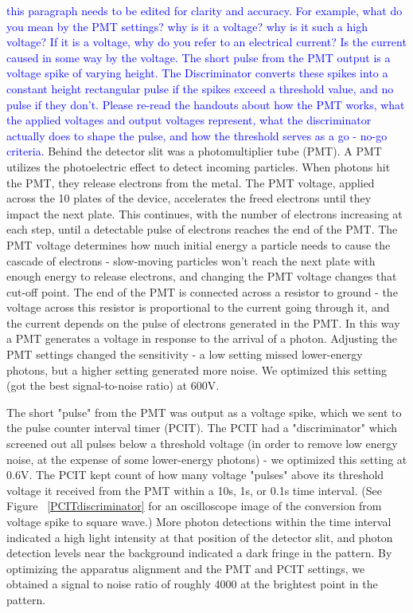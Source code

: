 \documentclass[prb,preprint]{revtex4-1}
\begin{document}
\textcolor{blue}{this paragraph needs to be edited for clarity and accuracy. For example, what do you mean by the PMT settings? why is it a voltage? why is it such a high voltage?  If it is a voltage, why do you refer to an electrical current? Is the current caused in some way by the voltage. The short pulse from the PMT output is a voltage spike of varying height. The Discriminator converts these spikes into a constant height rectangular pulse if the spikes exceed a threshold value, and no pulse if they don't.  Please re-read the handouts about how the PMT works, what the applied voltages and output voltages represent, what the discriminator actually does to shape the pulse, and how the threshold serves as a go - no-go criteria.}
Behind the detector slit was a photomultiplier tube (PMT).  A PMT utilizes the photoelectric effect to detect incoming particles. When photons hit the PMT, they release electrons from the metal. The PMT voltage, applied across the 10 plates of the device, accelerates the freed electrons until they impact the next plate.  This continues, with the number of electrons increasing at each step, until a detectable pulse of electrons reaches the end of the PMT.  The PMT voltage determines how much initial energy a particle needs to cause the cascade of electrons - slow-moving particles won't reach the next plate with enough energy to release electrons, and changing the PMT voltage changes that cut-off point.  The end of the PMT is connected across a resistor to ground - the voltage across this resistor is proportional to the current going through it, and the current depends on the pulse of electrons generated in the PMT.  In this way a PMT generates a voltage in response to the arrival of a photon.  Adjusting the PMT settings changed the sensitivity - a low setting missed lower-energy photons, but a higher setting generated more noise.  We optimized this setting (got the best signal-to-noise ratio) at 600V.  

The short "pulse" from the PMT was output as a voltage spike, which we sent to the pulse counter interval timer (PCIT).  The PCIT had a "discriminator" which screened out all pulses below a threshold voltage (in order to remove low energy noise, at the expense of some lower-energy photons) - we optimized this setting at 0.6V. The PCIT kept count of how many voltage "pulses" above its threshold voltage it received from the PMT within a 10s, 1s, or 0.1s time interval. (See Figure ~\ref{PCITdiscriminator} for an oscilloscope image of the conversion from voltage spike to square wave.)  More photon detections within the time interval indicated a high light intensity at that position of the detector slit, and photon detection levels near the background indicated a dark fringe in the pattern. By optimizing the apparatus alignment and the PMT and PCIT settings, we obtained a signal to noise ratio of roughly 4000 at the brightest point in the pattern. 
\end{document}
